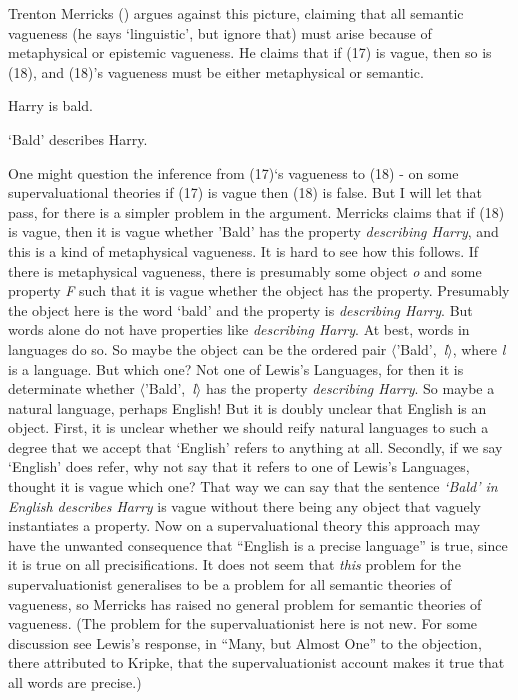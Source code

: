\documentclass[
  10pt,
  letterpaper,
  DIV=11,
  numbers=noendperiod,
  twoside]{scrartcl}
\providecommand{\tightlist}{%
  \setlength{\itemsep}{0pt}\setlength{\parskip}{0pt}}\usepackage{longtable,booktabs,array}
\begin{document}
Trenton Merricks () argues against this
picture, claiming that all semantic vagueness (he says `linguistic', but
ignore that) must arise because of metaphysical or epistemic vagueness.
He claims that if (17) is vague, then so is (18), and (18)'s vagueness
must be either metaphysical or semantic.

\begin{description}
\tightlist
\item[(17)]
Harry is bald.
\item[(18)]
`Bald' describes Harry.
\end{description}

One might question the inference from (17)`s vagueness to (18) - on some
supervaluational theories if (17) is vague then (18) is false. But I
will let that pass, for there is a simpler problem in the argument.
Merricks claims that if (18) is vague, then it is vague whether 'Bald'
has the property \emph{describing Harry}, and this is a kind of
metaphysical vagueness. It is hard to see how this follows. If there is
metaphysical vagueness, there is presumably some object \emph{o} and
some property \emph{F} such that it is vague whether the object has the
property. Presumably the object here is the word `bald' and the property
is \emph{describing Harry}. But words alone do not have properties like
\emph{describing Harry}. At best, words in languages do so. So maybe the
object can be the ordered pair \(\langle\)'Bald',~\emph{l}\(\rangle\),
where \emph{l} is a language. But which one? Not one of Lewis's
Languages, for then it is determinate whether
\(\langle\)'Bald',~\emph{l}\(\rangle\) has the property \emph{describing
Harry}. So maybe a natural language, perhaps English! But it is doubly
unclear that English is an object. First, it is unclear whether we
should reify natural languages to such a degree that we accept that
`English' refers to anything at all. Secondly, if we say `English' does
refer, why not say that it refers to one of Lewis's Languages, thought
it is vague which one? That way we can say that the sentence
\emph{`Bald' in English describes Harry} is vague without there being
any object that vaguely instantiates a property. Now on a
supervaluational theory this approach may have the unwanted consequence
that ``English is a precise language'' is true, since it is true on all
precisifications. It does not seem that \emph{this} problem for the
supervaluationist generalises to be a problem for all semantic theories
of vagueness, so Merricks has raised no general problem for semantic
theories of vagueness. (The problem for the supervaluationist here is
not new. For some discussion see Lewis's response, in ``Many, but Almost
One'' to the objection, there attributed to Kripke, that the
supervaluationist account makes it true that all words are precise.)
\end{document}
